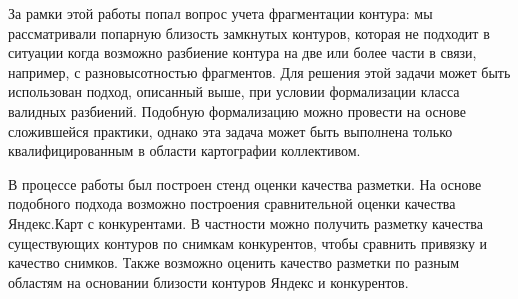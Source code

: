 \documentclass[12pt]{article}
\begin{document}
За рамки этой работы попал вопрос учета фрагментации контура: мы рассматривали попарную близость замкнутых контуров, которая не подходит в ситуации когда возможно разбиение контура на две или более части в связи, например, с разновысотностью фрагментов. Для решения этой задачи может быть использован подход, описанный выше, при условии формализации класса валидных разбиений. Подобную формализацию можно провести на основе сложившейся практики, однако эта задача может быть выполнена только квалифицированным в области картографии коллективом.

В процессе работы был построен стенд оценки качества разметки. На основе подобного подхода возможно построения сравнительной оценки качества Яндекс.Карт с конкурентами. В частности можно получить разметку качества существующих контуров по снимкам конкурентов, чтобы сравнить привязку и качество снимков. Также возможно оценить качество разметки по разным областям на основании близости контуров Яндекс и конкурентов.
\end{document}
